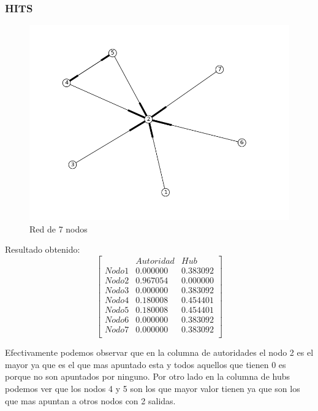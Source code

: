 \subsubsection{HITS}
 \begin{figure}[!htb]
\begin{center}
    \includegraphics[scale=0.5]{imagenes/test4.png}
    \caption{Red de 7 nodos}
    \end{center}
\end{figure}

Resultado obtenido:
   $$ 
\begin{bmatrix}
              &    Autoridad  &  Hub \\
 Nodo 1 &   0.000000    &      0.383092       \\
 Nodo 2   &  0.967054    &  0.000000     \\
 Nodo 3   &  0.000000   &     0.383092  \\
 Nodo 4   &  0.180008    &     0.454401       \\
 Nodo 5   &  0.180008    &     0.454401        \\
 Nodo 6   &  0.000000    &      0.383092     \\
 Nodo 7   &  0.000000   &     0.383092 \\
\end{bmatrix} 
$$

Efectivamente podemos observar que en la columna de autoridades el nodo 2 es el mayor ya que es el que mas apuntado esta y todos aquellos que tienen 0 es porque no son apuntados por ninguno. Por otro lado en la columna de hubs podemos ver que los nodos 4 y 5 son los que mayor valor tienen ya que son los que mas apuntan a otros nodos con 2 salidas.

